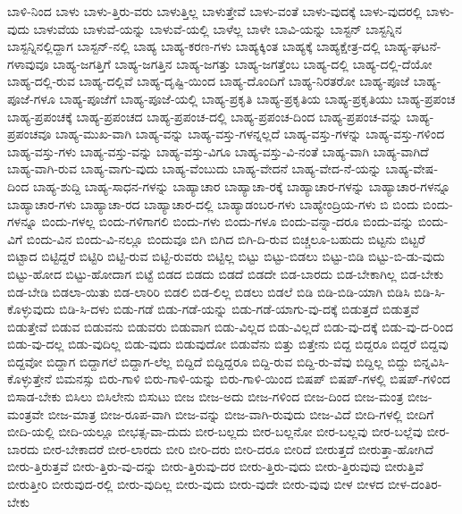 {ಬಾಳಿ-ನಿಂದ
ಬಾಳು
ಬಾಳು-ತ್ತಿರು-ವರು
ಬಾಳುತ್ತಿಲ್ಲ
ಬಾಳುತ್ತೇವೆ
ಬಾಳು-ವಂತೆ
ಬಾಳು-ವುದಕ್ಕೆ
ಬಾಳು-ವುದರಲ್ಲಿ
ಬಾಳು-ವುದು
ಬಾಳುವೆಯ
ಬಾಳುವೆ-ಯನ್ನು
ಬಾಳುವೆ-ಯಲ್ಲಿ
ಬಾಳೆಲ್ಲ
ಬಾಳೇ
ಬಾವಿ-ಯನ್ನು
ಬಾಸ್ಟನ್
ಬಾಸ್ಟನ್ನಿನ
ಬಾಸ್ಟನ್ನಿನಲ್ಲಿದ್ದಾಗ
ಬಾಸ್ಟನ್-ನಲ್ಲಿ
ಬಾಹ್ಯ
ಬಾಹ್ಯ-ಕರಣ-ಗಳು
ಬಾಹ್ಯಕ್ಕಿಂತ
ಬಾಹ್ಯಕ್ಕೆ
ಬಾಹ್ಯಕ್ಷೇತ್ರ-ದಲ್ಲಿ
ಬಾಹ್ಯ-ಘಟನೆ-ಗಳಾವುವೂ
ಬಾಹ್ಯ-ಜಗತ್ತಿಗೆ
ಬಾಹ್ಯ-ಜಗತ್ತಿನ
ಬಾಹ್ಯ-ಜಗತ್ತು
ಬಾಹ್ಯ-ಜಗತ್ತೆಂಬ
ಬಾಹ್ಯ-ದಲ್ಲಿ
ಬಾಹ್ಯ-ದಲ್ಲಿ-ದೆಯೋ
ಬಾಹ್ಯ-ದಲ್ಲಿ-ರುವ
ಬಾಹ್ಯ-ದಲ್ಲಿವೆ
ಬಾಹ್ಯ-ದೃಷ್ಟಿ-ಯಿಂದ
ಬಾಹ್ಯ-ದೊಂದಿಗೆ
ಬಾಹ್ಯ-ನಿರತರೋ
ಬಾಹ್ಯ-ಪೂಜೆ
ಬಾಹ್ಯ-ಪೂಜೆ-ಗಳೂ
ಬಾಹ್ಯ-ಪೂಜೆಗೆ
ಬಾಹ್ಯ-ಪೂಜೆ-ಯಲ್ಲಿ
ಬಾಹ್ಯ-ಪ್ರಕೃತಿ
ಬಾಹ್ಯ-ಪ್ರಕೃತಿಯ
ಬಾಹ್ಯ-ಪ್ರಕೃತಿಯು
ಬಾಹ್ಯ-ಪ್ರಪಂಚ
ಬಾಹ್ಯ-ಪ್ರಪಂಚಕ್ಕೆ
ಬಾಹ್ಯ-ಪ್ರಪಂಚದ
ಬಾಹ್ಯ-ಪ್ರಪಂಚ-ದಲ್ಲಿ
ಬಾಹ್ಯ-ಪ್ರಪಂಚ-ದಿಂದ
ಬಾಹ್ಯ-ಪ್ರಪಂಚ-ವನ್ನು
ಬಾಹ್ಯ-ಪ್ರಪಂಚವೂ
ಬಾಹ್ಯ-ಮುಖ-ವಾಗಿ
ಬಾಹ್ಯ-ವನ್ನು
ಬಾಹ್ಯ-ವಸ್ತು-ಗಳನ್ನಲ್ಲದೆ
ಬಾಹ್ಯ-ವಸ್ತು-ಗಳನ್ನು
ಬಾಹ್ಯ-ವಸ್ತು-ಗಳಿಂದ
ಬಾಹ್ಯ-ವಸ್ತು-ಗಳು
ಬಾಹ್ಯ-ವಸ್ತು-ವನ್ನು
ಬಾಹ್ಯ-ವಸ್ತು-ವಿಗೂ
ಬಾಹ್ಯ-ವಸ್ತು-ವಿ-ನಂತೆ
ಬಾಹ್ಯ-ವಾಗಿ
ಬಾಹ್ಯ-ವಾಗಿದೆ
ಬಾಹ್ಯ-ವಾಗಿ-ರುವ
ಬಾಹ್ಯ-ವಾಗು-ವುದು
ಬಾಹ್ಯ-ವೆಂಬುದು
ಬಾಹ್ಯ-ವೇದನೆ
ಬಾಹ್ಯ-ವೇದ-ನೆ-ಯನ್ನು
ಬಾಹ್ಯ-ವೇಷ-ದಿಂದ
ಬಾಹ್ಯ-ಶುದ್ದಿ
ಬಾಹ್ಯ-ಸಾಧನ-ಗಳನ್ನು
ಬಾಹ್ಯಾಚಾರ
ಬಾಹ್ಯಾಚಾ-ರಕ್ಕೆ
ಬಾಹ್ಯಾಚಾರ-ಗಳನ್ನು
ಬಾಹ್ಯಾಚಾರ-ಗಳನ್ನೂ
ಬಾಹ್ಯಾಚಾರ-ಗಳು
ಬಾಹ್ಯಾಚಾ-ರದ
ಬಾಹ್ಯಾಚಾರ-ದಲ್ಲಿ
ಬಾಹ್ಯಾಡಂಬರ-ಗಳು
ಬಾಹ್ಯೇಂದ್ರಿಯ-ಗಳು
ಬಿ
ಬಿಂದು
ಬಿಂದು-ಗಳನ್ನೂ
ಬಿಂದು-ಗಳಲ್ಲ
ಬಿಂದು-ಗಳಿಗಾಗಲಿ
ಬಿಂದು-ಗಳು
ಬಿಂದು-ಗಳೂ
ಬಿಂದು-ವನ್ನಾ-ದರೂ
ಬಿಂದು-ವನ್ನು
ಬಿಂದು-ವಿಗೆ
ಬಿಂದು-ವಿನ
ಬಿಂದು-ವಿ-ನಲ್ಲೂ
ಬಿಂದುವೂ
ಬಿಗಿ
ಬಿಗಿದ
ಬಿಗಿ-ದಿ-ರುವ
ಬಿಚ್ಚಲೂ-ಬಹುದು
ಬಿಟ್ಟನು
ಬಿಟ್ಟರೆ
ಬಿಟ್ಟಾದ
ಬಿಟ್ಟಿದ್ದರೆ
ಬಿಟ್ಟಿರಿ
ಬಿಟ್ಟಿ-ರುವ
ಬಿಟ್ಟಿ-ರುವರು
ಬಿಟ್ಟಿಲ್ಲ
ಬಿಟ್ಟು
ಬಿಟ್ಟು-ಬಿಡಲು
ಬಿಟ್ಟು-ಬಿಡಿ
ಬಿಟ್ಟು-ಬಿ-ಡು-ವುದು
ಬಿಟ್ಟು-ಹೋದ
ಬಿಟ್ಟು-ಹೋದಾಗ
ಬಿಟ್ಟೆ
ಬಿಡದ
ಬಿಡದು
ಬಿಡದೆ
ಬಿಡದೇ
ಬಿಡ-ಬಾರದು
ಬಿಡ-ಬೇಕಾಗಿಲ್ಲ
ಬಿಡ-ಬೇಕು
ಬಿಡ-ಬೇಡಿ
ಬಿಡಲಾ-ಯಿತು
ಬಿಡ-ಲಾರಿರಿ
ಬಿಡಲಿ
ಬಿಡ-ಲಿಲ್ಲ
ಬಿಡಲು
ಬಿಡಲೆ
ಬಿಡಿ
ಬಿಡಿ-ಬಿಡಿ-ಯಾಗಿ
ಬಿಡಿಸಿ
ಬಿಡಿ-ಸಿ-ಕೊಳ್ಳುವುದು
ಬಿಡಿ-ಸಿ-ದಳು
ಬಿಡು-ಗಡೆ
ಬಿಡು-ಗಡೆ-ಯನ್ನು
ಬಿಡು-ಗಡೆ-ಯಾಗು-ವು-ದಕ್ಕೆ
ಬಿಡುತ್ತದೆ
ಬಿಡುತ್ತವೆ
ಬಿಡುತ್ತೇವೆ
ಬಿಡುವ
ಬಿಡುವನು
ಬಿಡುವರು
ಬಿಡುವಾಗ
ಬಿಡು-ವಿಲ್ಲದ
ಬಿಡು-ವಿಲ್ಲದೆ
ಬಿಡು-ವು-ದಕ್ಕೆ
ಬಿಡು-ವು-ದ-ರಿಂದ
ಬಿಡು-ವು-ದಲ್ಲ
ಬಿಡು-ವುದಿಲ್ಲ
ಬಿಡು-ವುದು
ಬಿಡುವುದೋ
ಬಿಡುವೆನು
ಬಿತ್ತು
ಬಿತ್ತೇನು
ಬಿದ್ದ
ಬಿದ್ದರೂ
ಬಿದ್ದರೆ
ಬಿದ್ದವು
ಬಿದ್ದವೋ
ಬಿದ್ದಾಗ
ಬಿದ್ದಾಗಲೆ
ಬಿದ್ದಾಗ-ಲೆಲ್ಲ
ಬಿದ್ದಿದೆ
ಬಿದ್ದಿದ್ದರೂ
ಬಿದ್ದಿ-ರುವ
ಬಿದ್ದಿ-ರು-ವೆವು
ಬಿದ್ದಿಲ್ಲ
ಬಿದ್ದು
ಬಿನ್ನವಿಸಿ-ಕೊಳ್ಳುತ್ತೇನೆ
ಬಿಮನಸ್ಸು
ಬಿರು-ಗಾಳಿ
ಬಿರು-ಗಾಳಿ-ಯನ್ನು
ಬಿರು-ಗಾಳಿ-ಯಿಂದ
ಬಿಷಪ್
ಬಿಷಪ್-ಗಳಲ್ಲಿ
ಬಿಷಪ್-ಗಳಿಂದ
ಬಿಸಾಡ-ಬೇಕು
ಬಿಸಿಲು
ಬಿಸಿಲೇನು
ಬಿಸುಟು
ಬೀಜ
ಬೀಜ-ಅದು
ಬೀಜ-ಗಳಿಂದ
ಬೀಜ-ದಿಂದ
ಬೀಜ-ಮಂತ್ರ
ಬೀಜ-ಮಂತ್ರವೇ
ಬೀಜ-ಮಾತ್ರ
ಬೀಜ-ರೂಪ-ವಾಗಿ
ಬೀಜ-ವನ್ನು
ಬೀಜ-ವಾಗಿ-ರುವುದು
ಬೀಜ-ವಿದೆ
ಬೀದಿ-ಗಳಲ್ಲಿ
ಬೀದಿಗೆ
ಬೀದಿ-ಯಲ್ಲಿ
ಬೀದಿ-ಯಲ್ಲೂ
ಬೀಭತ್ಸ-ವಾ-ದುದು
ಬೀರ-ಬಲ್ಲದು
ಬೀರ-ಬಲ್ಲನೋ
ಬೀರ-ಬಲ್ಲವು
ಬೀರ-ಬಲ್ಲೆವು
ಬೀರ-ಬಾರದು
ಬೀರ-ಬೇಕಾದರೆ
ಬೀರ-ಲಾರದು
ಬೀರಿ
ಬೀರಿ-ದರು
ಬೀರಿ-ದರೂ
ಬೀರಿದೆ
ಬೀರುತ್ತದೆ
ಬೀರುತ್ತಾ-ಹೋಗಿದೆ
ಬೀರು-ತ್ತಿರುತ್ತವೆ
ಬೀರು-ತ್ತಿರು-ವು-ದನ್ನು
ಬೀರು-ತ್ತಿರುವು-ದರ
ಬೀರು-ತ್ತಿರು-ವುದು
ಬೀರು-ತ್ತಿರುವುವು
ಬೀರುತ್ತಿವೆ
ಬೀರುತ್ತೀರಿ
ಬೀರುವುದ-ರಲ್ಲಿ
ಬೀರು-ವುದಿಲ್ಲ
ಬೀರು-ವುದು
ಬೀರು-ವುದೇ
ಬೀರು-ವುವು
ಬೀಳ
ಬೀಳದ
ಬೀಳ-ದಂತಿರ-ಬೇಕು
}
